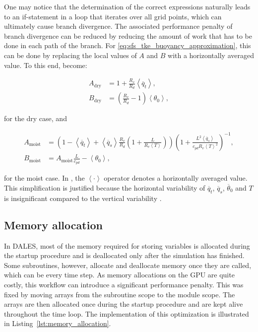 One may notice that the determination of the correct expressions naturally leads to an if-statement in a loop that iterates over all grid points, which can ultimately cause branch divergence. The associated performance penalty of branch divergence can be reduced by reducing the amount of work that has to be done in each path of the branch. For \autoref{eq:sfs_tke_buoyancy_approximation}, this can be done by replacing the local values of $A$ and $B$ with a horizontally averaged value. To this end,  become:

\begin{equation}
  \begin{split}
    A_{\text{dry}} &= 1 + \frac{R_v}{R_d}\left< \overline{q}_t \right>, \\
    B_{\text{dry}} &= \left( \frac{R_v}{R_d} - 1 \right) \left< \theta_0 \right>,
  \end{split}
  \label{eq:dry_coefficients_averaged}
\end{equation}

for the dry case, and

\begin{equation}
  \begin{split}
    A_{\text{moist}} &= \left( 1 - \left< \overline{q}_t \right> + \left< \overline{q}_s \right> \frac{R_v}{R_d} \left( 1 + \frac{L}{R_v \left< T \right>} \right) \right) \left(1 + \frac{L^2 \left< \overline{q}_s \right>}{c_{pd} R_v \left< T \right>^2} \right)^{-1}, \\
    B_{\text{moist}} &= A_{\text{moist}} \frac{L}{c_{pd}} - \left< \theta_0 \right>,
  \end{split}
  \label{eq:wet_coefficients_averaged}
\end{equation}

for the moist case. In , the $\left< \cdot \right>$ operator denotes a horizontally averaged value. This simplification is justified because the horizontal variability of $\overline{q}_t$, $\overline{q}_s$, $\overline{\theta}_0$ and $T$ is insignificant compared to the vertical variability .

\subsection{Memory allocation}
In DALES, most of the memory required for storing variables is allocated during the startup procedure and is deallocated only after the simulation has finished. Some subroutines, however, allocate and deallocate memory once they are called, which can be every time step. As memory allocations on the GPU are quite costly, this workflow can introduce a significant performance penalty. This was fixed by moving arrays from the subroutine scope to the module scope. The arrays are then allocated once during the startup procedure and are kept alive throughout the time loop. The implementation of this optimization is illustrated in Listing~\ref{lst:memory_allocation}. 

